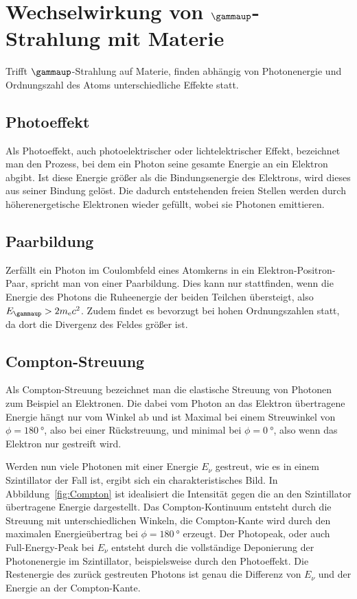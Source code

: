 \section{Wechselwirkung von $\gammaup$-Strahlung mit Materie}
\label{sec:WW}

Trifft $\gammaup$-Strahlung auf Materie, finden abhängig von Photonenergie und
Ordnungszahl des Atoms unterschiedliche Effekte statt.

\subsection{Photoeffekt}

Als Photoeffekt, auch photoelektrischer oder lichtelektrischer Effekt,
bezeichnet man den Prozess, bei dem ein Photon seine gesamte Energie an ein
Elektron abgibt. Ist diese Energie größer als die Bindungsenergie des
Elektrons, wird dieses aus seiner Bindung gelöst. Die dadurch entstehenden
freien Stellen werden durch höherenergetische Elektronen wieder gefüllt, wobei
sie Photonen emittieren.

\subsection{Paarbildung}

Zerfällt ein Photon im Coulombfeld eines Atomkerns in ein
Elektron-Positron-Paar, spricht man von einer Paarbildung. Dies kann nur
stattfinden, wenn die Energie des Photons die Ruheenergie der beiden Teilchen
übersteigt, also $E_\gammaup > 2m_\mathrm{e}c^2$. Zudem findet es bevorzugt bei
hohen Ordnungszahlen statt, da dort die Divergenz des Feldes größer ist.

\subsection{Compton-Streuung}

Als Compton-Streuung bezeichnet man die elastische Streuung von Photonen zum
Beispiel an Elektronen. Die dabei vom Photon an das Elektron übertragene
Energie hängt nur vom Winkel ab und ist Maximal bei einem Streuwinkel von $\phi
= \SI{180}\degree$, also bei einer Rückstreuung, und minimal bei $\phi =
\SI{0}\degree$, also wenn das Elektron nur gestreift wird.

Werden nun viele Photonen mit einer Energie $E_\nu$ gestreut, wie es in einem
Szintillator der Fall ist, ergibt sich ein charakteristisches Bild. In
Abbildung~\ref{fig:Compton} ist idealisiert die Intensität gegen die an den
Szintillator übertragene Energie dargestellt. Das Compton-Kontinuum entsteht
durch die Streuung mit unterschiedlichen Winkeln, die Compton-Kante wird durch
den maximalen Energieübertrag bei $\phi = \SI{180}{\degree}$ erzeugt. Der
Photopeak, oder auch Full-Energy-Peak bei $E_\nu$ entsteht durch die
vollständige Deponierung der Photonenergie im Szintillator, beispielsweise
durch den Photoeffekt. Die Restenergie des zurück gestreuten Photons ist genau
die Differenz von $E_\nu$ und der Energie an der Compton-Kante.

